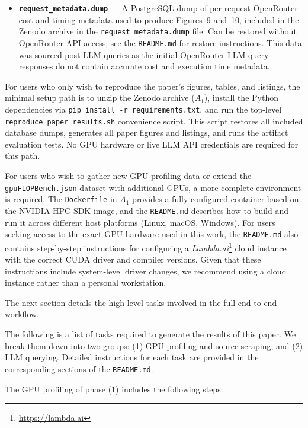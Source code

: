 \documentclass[conference]{IEEEtran}
\begin{document}
\begin{itemize}
    \item \textbf{\texttt{request\_metadata.dump}} --- A PostgreSQL dump of per-request OpenRouter cost and timing metadata used to produce Figures~9 and~10, included in the Zenodo archive in the \texttt{request\_metadata.dump} file.
    Can be restored without OpenRouter API access; see the \texttt{README.md} for restore instructions.
    This data was sourced post-LLM-queries as the initial OpenRouter LLM query responses do not contain accurate cost and execution time metadata.
\end{itemize}


For users who only wish to reproduce the paper's figures, tables, and listings, the minimal setup path is to unzip the Zenodo archive ($A_1$), install the Python dependencies via \texttt{pip install -r requirements.txt}, and run the top-level \texttt{reproduce\_paper\_results.sh} convenience script.
This script restores all included database dumps, generates all paper figures and listings, and runs the artifact evaluation tests.
No GPU hardware or live LLM API credentials are required for this path.

For users who wish to gather new GPU profiling data or extend the \texttt{gpuFLOPBench.json} dataset with additional GPUs, a more complete environment is required.
The \texttt{Dockerfile} in $A_1$ provides a fully configured container based on the NVIDIA HPC SDK image, and the \texttt{README.md} describes how to build and run it across different host platforms (Linux, macOS, Windows).
For users seeking access to the exact GPU hardware used in this work, the \texttt{README.md} also contains step-by-step instructions for configuring a \textit{Lambda.ai}\footnote{\url{https://lambda.ai}} cloud instance with the correct CUDA driver and compiler versions.
Given that these instructions include system-level driver changes, we recommend using a cloud instance rather than a personal workstation.

The next section details the high-level tasks involved in the full end-to-end workflow.

\artcomp

The following is a list of tasks required to generate the results of this paper.
We break them down into two groups: (1) GPU profiling and source scraping, and (2) LLM querying.
Detailed instructions for each task are provided in the corresponding sections of the \texttt{README.md}.

The GPU profiling of phase (1) includes the following steps:
\end{document}
